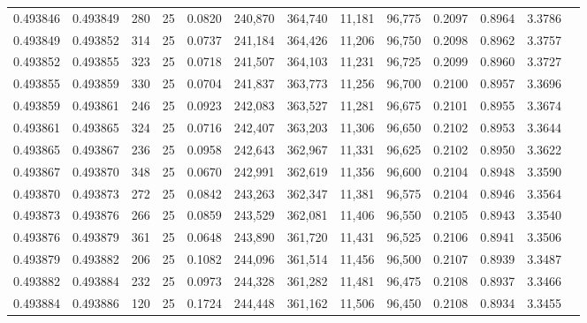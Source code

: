 \begin{tabular}{rrrrrrrrrrrrr}
0.493846 & 0.493849 &   280 &  25 &                                     0.0820 & 240,870 & 364,740 &  11,181 &  96,775 & 0.2097 & 0.8964 & 3.3786 \\
0.493849 & 0.493852 &   314 &  25 &                                     0.0737 & 241,184 & 364,426 &  11,206 &  96,750 & 0.2098 & 0.8962 & 3.3757 \\
0.493852 & 0.493855 &   323 &  25 &                                     0.0718 & 241,507 & 364,103 &  11,231 &  96,725 & 0.2099 & 0.8960 & 3.3727 \\
0.493855 & 0.493859 &   330 &  25 &                                     0.0704 & 241,837 & 363,773 &  11,256 &  96,700 & 0.2100 & 0.8957 & 3.3696 \\
0.493859 & 0.493861 &   246 &  25 &                                     0.0923 & 242,083 & 363,527 &  11,281 &  96,675 & 0.2101 & 0.8955 & 3.3674 \\
0.493861 & 0.493865 &   324 &  25 &                                     0.0716 & 242,407 & 363,203 &  11,306 &  96,650 & 0.2102 & 0.8953 & 3.3644 \\
0.493865 & 0.493867 &   236 &  25 &                                     0.0958 & 242,643 & 362,967 &  11,331 &  96,625 & 0.2102 & 0.8950 & 3.3622 \\
0.493867 & 0.493870 &   348 &  25 &                                     0.0670 & 242,991 & 362,619 &  11,356 &  96,600 & 0.2104 & 0.8948 & 3.3590 \\
0.493870 & 0.493873 &   272 &  25 &                                     0.0842 & 243,263 & 362,347 &  11,381 &  96,575 & 0.2104 & 0.8946 & 3.3564 \\
0.493873 & 0.493876 &   266 &  25 &                                     0.0859 & 243,529 & 362,081 &  11,406 &  96,550 & 0.2105 & 0.8943 & 3.3540 \\
0.493876 & 0.493879 &   361 &  25 &                                     0.0648 & 243,890 & 361,720 &  11,431 &  96,525 & 0.2106 & 0.8941 & 3.3506 \\
0.493879 & 0.493882 &   206 &  25 &                                     0.1082 & 244,096 & 361,514 &  11,456 &  96,500 & 0.2107 & 0.8939 & 3.3487 \\
0.493882 & 0.493884 &   232 &  25 &                                     0.0973 & 244,328 & 361,282 &  11,481 &  96,475 & 0.2108 & 0.8937 & 3.3466 \\
0.493884 & 0.493886 &   120 &  25 &                                     0.1724 & 244,448 & 361,162 &  11,506 &  96,450 & 0.2108 & 0.8934 & 3.3455 \\

\end{tabular}
